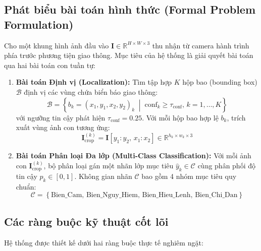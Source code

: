 \documentclass[a4paper, 11pt]{article}
\begin{document}
\subsection{Phát biểu bài toán hình thức (Formal Problem Formulation)}
\label{subsec:phat_bieu_hinh_thuc}

Cho một khung hình ảnh đầu vào $\mathbf{I} \in \mathbb{R}^{H \times W \times 3}$ thu nhận từ camera hành trình phía trước phương tiện giao thông. Mục tiêu của hệ thống là giải quyết bài toán qua hai bài toán con tuần tự:

\begin{enumerate}
    \item \textbf{Bài toán Định vị (Localization):} Tìm tập hợp $K$ hộp bao (bounding box) $\mathcal{B}$ định vị các vùng chứa biển báo giao thông:
    \begin{equation}
        \mathcal{B} = \left\{ b_k = (x_1, y_1, x_2, y_2)_k \;\middle|\; \text{conf}_k \ge \tau_{\text{conf}}, \, k = 1, \dots, K \right\}
        \label{eq:localization}
    \end{equation}
    với ngưỡng tin cậy phát hiện $\tau_{\text{conf}} = 0.25$. Với mỗi hộp bao hợp lệ $b_k$, trích xuất vùng ảnh con tương ứng:
    \begin{equation}
        \mathbf{I}^{(k)}_{\text{crop}} = \mathbf{I}[y_1 : y_2, \, x_1 : x_2] \in \mathbb{R}^{h_k \times w_k \times 3}
        \label{eq:crop}
    \end{equation}

    \item \textbf{Bài toán Phân loại Đa lớp (Multi-Class Classification):} Với mỗi ảnh con $\mathbf{I}^{(k)}_{\text{crop}}$, bộ phân loại gán một nhãn lớp mục tiêu $\hat{y}_k \in \mathcal{C}$ cùng phân phối độ tin cậy $p_k \in [0, 1]$. Không gian nhãn $\mathcal{C}$ bao gồm 4 nhóm mục tiêu quy chuẩn:
    \begin{equation}
        \mathcal{C} = \left\{ \text{Bien\_Cam}, \, \text{Bien\_Nguy\_Hiem}, \, \text{Bien\_Hieu\_Lenh}, \, \text{Bien\_Chi\_Dan} \right\}
        \label{eq:classes}
    \end{equation}
\end{enumerate}

\subsection{Các ràng buộc kỹ thuật cốt lõi}
\label{subsec:rang_buoc_ky_thuat}

Hệ thống được thiết kế dưới hai ràng buộc thực tế nghiêm ngặt:
\end{document}
